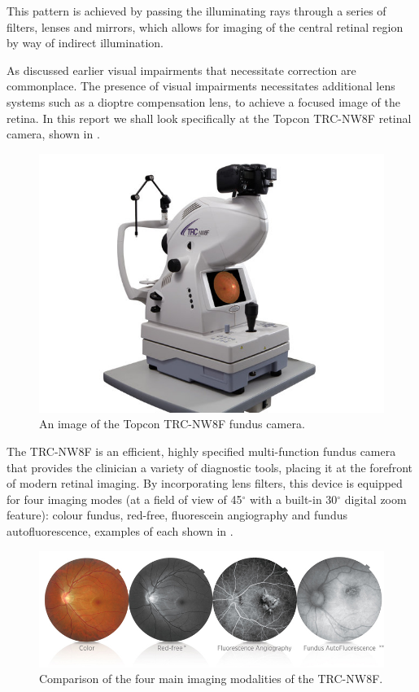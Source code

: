 This pattern is achieved by passing the illuminating rays through a series
of filters, lenses and mirrors,  which allows for imaging of the
central retinal region by way of indirect illumination. 

As discussed earlier visual impairments that necessitate correction
are commonplace. The presence of visual impairments necessitates
additional lens systems such as a dioptre compensation lens, to achieve
a focused image of the
retina. In this report we shall look specifically at the Topcon TRC-NW8F
retinal camera, shown in .

\begin{figure}[H]
\centering
\includegraphics{figures/trc}
\caption{An image of the Topcon TRC-NW8F fundus camera.\cite{1_topconmedical.com_2015}}
\label{fig:trc}
\end{figure}


The TRC-NW8F is an efficient, highly specified multi-function fundus camera
that provides the clinician a variety of diagnostic tools, placing it at the
forefront of modern retinal imaging. By incorporating lens filters, this device
is equipped for four imaging modes (at a field of view of 45$^\circ$ with a
built-in 30$^\circ$ digital zoom feature): colour fundus, red-free, fluorescein
angiography and fundus autofluorescence, examples of each shown in .

\begin{figure}[H]
\centering
\includegraphics{figures/imagingmodes}
\caption{Comparison of the four main imaging modalities of the TRC-NW8F.\cite{1_topconmedical.com_2015}}
\label{fig:im}
\end{figure}


